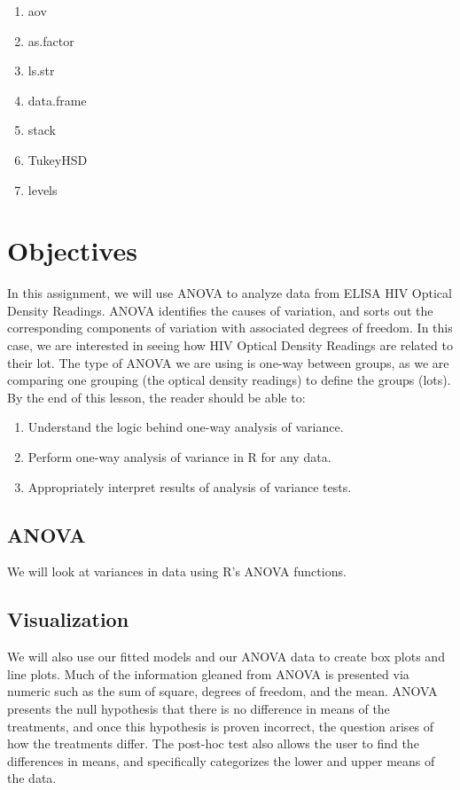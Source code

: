 \documentclass[11pt]{article}
\begin{document}
\begin{enumerate}
\item aov
\item as.factor
\item ls.str
\item data.frame
\item stack
\item TukeyHSD
\item levels
\end{enumerate}


\section{Objectives}

In this assignment, we will use ANOVA to analyze data from ELISA HIV Optical Density Readings. ANOVA identifies the causes of variation, and sorts out the corresponding components of variation with associated degrees of freedom. In this case, we are interested in seeing how HIV Optical Density Readings are related to their lot. The type of ANOVA we are using is one-way between groups, as we are comparing one grouping (the optical density readings) to define the groups (lots). 
\singlespacing
By the end of this lesson, the reader should be able to:
\begin{enumerate}
\item Understand the logic behind one-way analysis of variance.
\item Perform one-way analysis of variance in R for any data. 
\item Appropriately interpret results of analysis of variance tests.
\end{enumerate}

\subsection{ANOVA}

We will look at variances in data using R's ANOVA functions.

\subsection{Visualization}

We will also use our fitted models and our ANOVA data to create box plots and line plots. Much of the information gleaned from ANOVA is presented via numeric such as the sum of square, degrees of freedom, and the mean. ANOVA presents the null hypothesis that there is no difference in means of the treatments, and once this hypothesis is proven incorrect, the question arises of how the treatments differ. The post-hoc test also allows the user to find the differences in means, and specifically categorizes the lower and upper means of the data.
\end{document}
